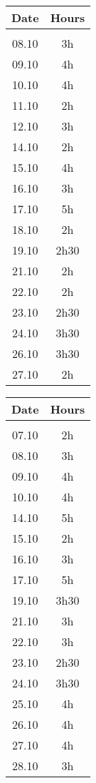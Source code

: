 \newpage
{}
\vspace{0.5cm}
\begin{tabular}[H]{cc}
	Date & Hours\\
	\hline\\
	08.10	&	3h\\
	09.10	&	4h\\
	10.10	&	4h\\
	11.10	&	2h\\
	12.10	&	3h\\
	14.10	&	2h\\
	15.10	&	4h\\
	16.10	&	3h\\
	17.10	&	5h\\
	18.10	&	2h\\
	19.10	&	2h30\\
	21.10	&	2h\\
	22.10	&	2h\\
	23.10	&	2h30\\
	24.10	&	3h30\\
	26.10	&	3h30\\
	27.10	&	2h
\end{tabular}

\vspace{0.5cm}
\begin{tabular}[H]{cc}
	Date & Hours\\
	\hline\\
	07.10	&	2h\\
	08.10	&	3h\\
	09.10	&	4h\\
	10.10	&	4h\\
	14.10	&	5h\\
	15.10	&	2h\\
	16.10	&	3h\\
	17.10	&	5h\\
	19.10	&	3h30\\
	21.10	&	3h\\
	22.10	&	3h\\
	23.10	&	2h30\\
	24.10	&	3h30\\
	25.10	&	4h\\
	26.10	&	4h\\
	27.10	&	4h\\
	28.10	&	3h
\end{tabular}